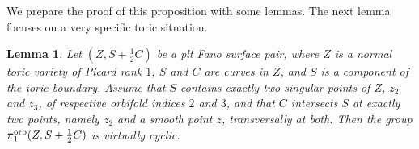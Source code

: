\documentclass{amsart}
\newtheorem{lemma}[theorem]{Lemma}
\theoremstyle{definition}
\theoremstyle{remark}
\numberwithin{equation}{section}
\begin{document}
We prepare the proof of this proposition with some lemmas. The next lemma focuses on a very specific toric situation.

\begin{lemma}\label{lem:toric-fund-group-4}
Let $(Z,S+\frac{1}{2}C)$ be a plt Fano surface pair, where
$Z$ is a normal toric variety of Picard rank $1$, $S$ and $C$ are curves in $Z$, and $S$ is a component of the toric boundary. Assume that $S$ contains exactly two singular points of $Z$, $z_2$ and $z_3$, of respective orbifold indices $2$ and $3$, and that $C$ intersects $S$ at exactly two points, namely $z_2$ and a smooth point $z$, transversally at both.
Then the group  
$\pi_1^{\rm orb}(Z,S+\frac{1}{2}C)$ is virtually cyclic.
\end{lemma}
\end{document}
